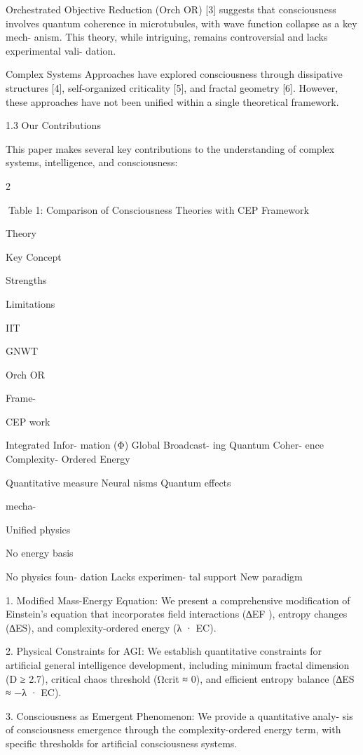 Orchestrated Objective Reduction (Orch OR) [3] suggests that consciousness
involves quantum coherence in microtubules, with wave function collapse as a key mech-
anism. This theory, while intriguing, remains controversial and lacks experimental vali-
dation.

Complex Systems Approaches have explored consciousness through dissipative
structures [4], self-organized criticality [5], and fractal geometry [6]. However, these
approaches have not been unified within a single theoretical framework.

1.3 Our Contributions

This paper makes several key contributions to the understanding of complex systems,
intelligence, and consciousness:

2

Table 1: Comparison of Consciousness Theories with CEP Framework

Theory

Key Concept

Strengths

Limitations

IIT

GNWT

Orch OR

Frame-

CEP
work

Integrated Infor-
mation (Φ)
Global Broadcast-
ing
Quantum Coher-
ence
Complexity-
Ordered Energy

Quantitative
measure
Neural
nisms
Quantum effects

mecha-

Unified physics

No energy basis

No physics foun-
dation
Lacks experimen-
tal support
New paradigm

1. Modified Mass-Energy Equation: We present a comprehensive modification
of Einstein’s equation that incorporates field interactions (∆EF ), entropy changes
(∆ES), and complexity-ordered energy (λ · EC).

2. Physical Constraints for AGI: We establish quantitative constraints for artificial
general intelligence development, including minimum fractal dimension (D ≥ 2.7),
critical chaos threshold (Ωcrit ≈ 0), and efficient entropy balance (∆ES ≈ −λ · EC).

3. Consciousness as Emergent Phenomenon: We provide a quantitative analy-
sis of consciousness emergence through the complexity-ordered energy term, with
specific thresholds for artificial consciousness systems.

